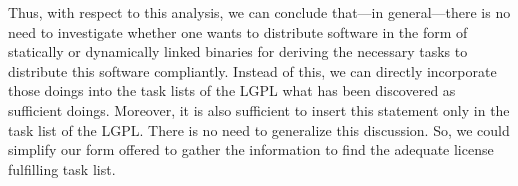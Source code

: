 Thus, with respect to this analysis, we can conclude that---in general---there
is no need to investigate whether one wants to distribute software in the form 
of statically or dynamically linked binaries for deriving the necessary tasks 
to distribute this software compliantly. 
Instead of this, we can directly incorporate those doings into the task lists 
of the LGPL what has been discovered as sufficient doings. 
Moreover, it is also sufficient to insert this statement only in the task list 
of the LGPL. 
There is no need to generalize this discussion. 
So, we could simplify our form offered to gather the information to find the 
adequate license fulfilling task list.


%


